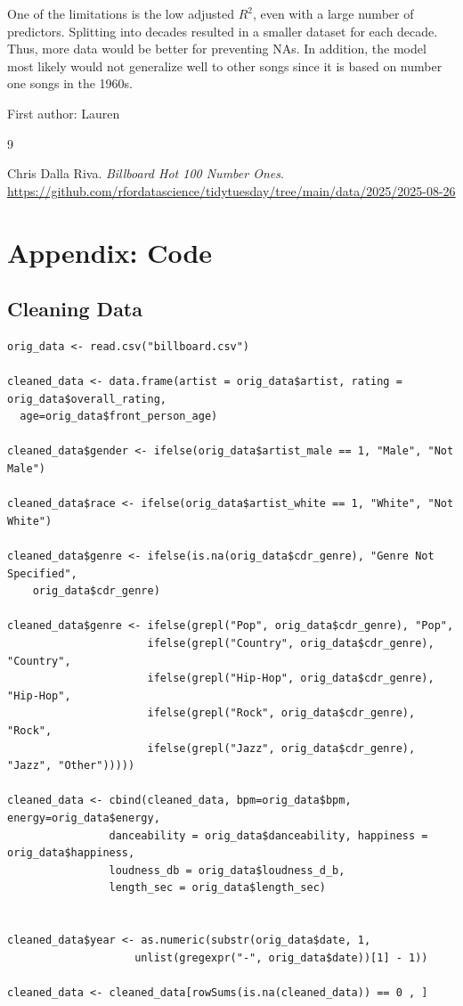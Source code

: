 \documentclass[11pt]{article}
\begin{document}
\noindent One of the limitations is the low adjusted $R^2$, even with a large number of predictors. Splitting into decades resulted in a smaller dataset for each decade. 
\noindent Thus, more data would be better for preventing NAs. In addition, the model most likely would not generalize well to other songs since it is based on number one songs in the 1960s. 

{\scriptsize First author: Lauren}
\vspace{-0.3cm}
\begin{thebibliography}{9}

Chris Dalla Riva.
\textit{Billboard Hot 100 Number Ones}.
\url{https://github.com/rfordatascience/tidytuesday/tree/main/data/2025/2025-08-26}

\end{thebibliography}


\newpage
\appendix
\section{Appendix: Code}

\subsection{Cleaning Data}
\begin{verbatim}
orig_data <- read.csv("billboard.csv")

cleaned_data <- data.frame(artist = orig_data$artist, rating = orig_data$overall_rating, 
  age=orig_data$front_person_age)

cleaned_data$gender <- ifelse(orig_data$artist_male == 1, "Male", "Not Male")

cleaned_data$race <- ifelse(orig_data$artist_white == 1, "White", "Not White")

cleaned_data$genre <- ifelse(is.na(orig_data$cdr_genre), "Genre Not Specified", 
    orig_data$cdr_genre)

cleaned_data$genre <- ifelse(grepl("Pop", orig_data$cdr_genre), "Pop", 
                      ifelse(grepl("Country", orig_data$cdr_genre), "Country",
                      ifelse(grepl("Hip-Hop", orig_data$cdr_genre), "Hip-Hop",
                      ifelse(grepl("Rock", orig_data$cdr_genre), "Rock",
                      ifelse(grepl("Jazz", orig_data$cdr_genre), "Jazz", "Other")))))

cleaned_data <- cbind(cleaned_data, bpm=orig_data$bpm, energy=orig_data$energy, 
                danceability = orig_data$danceability, happiness = orig_data$happiness, 
                loudness_db = orig_data$loudness_d_b, 
                length_sec = orig_data$length_sec)


cleaned_data$year <- as.numeric(substr(orig_data$date, 1, 
                    unlist(gregexpr("-", orig_data$date))[1] - 1))

cleaned_data <- cleaned_data[rowSums(is.na(cleaned_data)) == 0 , ]
\end{verbatim}
\end{document}
